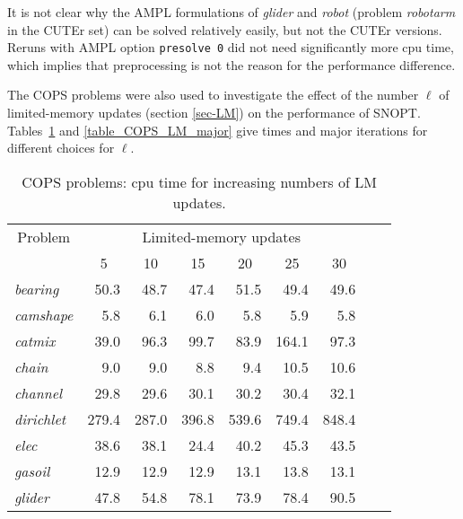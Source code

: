 \documentclass[draft,leqno,onefignum,onetabnum]{siamltex}
\def\strut{\rule[-1.25ex]{0pt}{4ex}}%
\def\strutu{\rule{0pt}{3ex}}%
\def\v#1{\texttt{#1}}
\def\AMPL  {{\small AMPL}}
\def\COPS  {{\small COPS}}
\def\CUTEr {{\small CUTEr}}
\def\SNOPT {{\small SNOPT}}
\def\Cute#1{\hbox{\it\lowercase{#1}\/}}
\def\Ampl#1{\hbox{\it#1\/}}
\begin{document}
It is not clear why the \AMPL{} formulations of
\Ampl{glider} and \Ampl{robot} (problem
\Cute{ROBOTARM} in the \CUTEr{} set) can be solved relatively easily,
but not the \CUTEr{} versions.
Reruns with \AMPL{} option \v{presolve 0} did not need
significantly more cpu time, which implies that preprocessing
is not the reason for the performance difference.

The \COPS{} problems were also used to investigate the
effect of the number $\ell$ of limited-memory updates
(section \ref{sec-LM}) on the performance of \SNOPT\@.
Tables~\ref{table_COPS_LM} and \ref{table_COPS_LM_major}
give times and major iterations for different choices for
$\ell$.

\begin{table}[p]
\caption{\label{table_COPS_LM}  COPS problems: cpu time for increasing numbers of LM updates.}
\begin{center}  \footnotesize %
\begin{tabular}{|l|r|r|r|r|r|r|r|r|}\hline
 \multicolumn{1}{|c|}{\strut Problem}&
 \multicolumn{6}{c|}{Limited-memory updates}\\\cline{2-7}
 \multicolumn{1}{|c|}{\strut }&
 \multicolumn{1}{c|}{ 5}&
 \multicolumn{1}{c|}{10}&
 \multicolumn{1}{c|}{15}&
 \multicolumn{1}{c|}{20}&
 \multicolumn{1}{c|}{25}&
 \multicolumn{1}{c|}{30}\\\hline\strutu%
          \Cute{bearing}    &  50.3    &  48.7    &  47.4    &  51.5    &  49.4     &  49.6
\\        \Cute{camshape}   &   5.8    &   6.1    &   6.0    &   5.8    &   5.9     &   5.8
\\        \Cute{catmix}     &  39.0    &  96.3    &  99.7    &  83.9    & 164.1     &  97.3
\\        \Cute{chain}      &   9.0    &   9.0    &   8.8    &   9.4    &  10.5     &  10.6
\\        \Cute{channel}    &  29.8    &  29.6    &  30.1    &  30.2    &  30.4     &  32.1
\\        \Cute{dirichlet}  & 279.4    & 287.0    & 396.8    & 539.6    & 749.4     & 848.4
\\        \Cute{elec}       &  38.6    &  38.1    &  24.4    &  40.2    &  45.3     &  43.5
\\        \Cute{gasoil}     &  12.9    &  12.9    &  12.9    &  13.1    &  13.8     &  13.1
\\        \Cute{glider}     &  47.8    &  54.8    &  78.1    &  73.9    &  78.4     &  90.5

\end{tabular}
\end{center}
\end{table}
\end{document}
